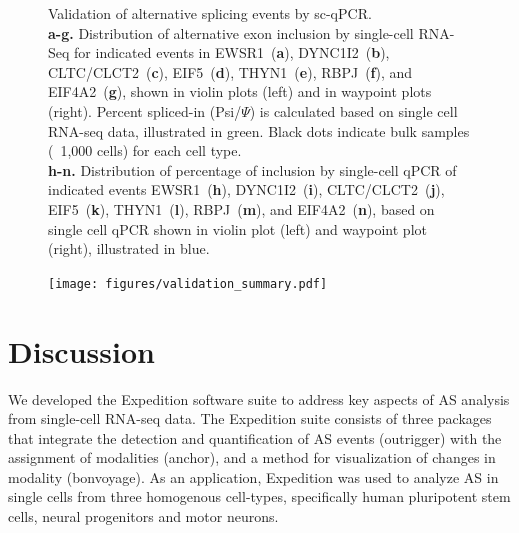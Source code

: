 \clearpage
\thispagestyle{facingcaption}
\begin{figure}[h]
  \caption[Validation of alternative splicing events by sc-qPCR.]{
  Validation of alternative splicing events by sc-qPCR.\\
\textbf{a-g.} Distribution of alternative exon inclusion by single-cell RNA-Seq for indicated events in EWSR1~(\textbf{a}), DYNC1I2~(\textbf{b}), CLTC/CLCT2~(\textbf{c}), EIF5~(\textbf{d}), THYN1~(\textbf{e}), RBPJ~(\textbf{f}), and EIF4A2~(\textbf{g}), shown in violin plots (left) and in waypoint plots (right). Percent spliced-in (Psi/$\Psi$) is calculated based on single cell RNA-seq data, illustrated in green. Black dots indicate bulk samples (~1,000 cells) for each cell type.\\
\textbf{h-n.} Distribution of percentage of inclusion by single-cell qPCR of indicated events EWSR1~(\textbf{h}), DYNC1I2~(\textbf{i}), CLTC/CLCT2~(\textbf{j}), EIF5~(\textbf{k}), THYN1~(\textbf{l}), RBPJ~(\textbf{m}), and EIF4A2~(\textbf{n}), based on single cell qPCR shown in violin plot (left) and waypoint plot (right), illustrated in blue.
}
\label{fig:validation}
\end{figure}
\clearpage
\begin{figure}[h]
\ContinuedFloat
\captionsetup{labelformat=empty}
\centering
\texttt{[image: figures/validation\_summary.pdf]}
\end{figure}
\clearpage



\section{Discussion}
We developed the Expedition software suite to address key aspects of AS analysis from single-cell RNA-seq data. The Expedition suite consists of three packages that integrate the detection and quantification of AS events (outrigger) with the assignment of modalities (anchor), and a method for visualization of changes in modality (bonvoyage). As an application, Expedition was used to analyze AS in single cells from three homogenous cell-types, specifically human pluripotent stem cells, neural progenitors and motor neurons.

